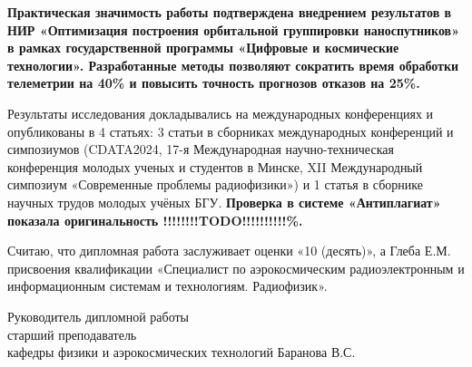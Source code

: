 \documentclass[14pt, a4paper]{bsu_review}
\begin{document}
\textbf{Практическая значимость работы подтверждена внедрением результатов в НИР «Оптимизация построения орбитальной группировки наноспутников» в рамках государственной программы «Цифровые и космические технологии». Разработанные методы позволяют сократить время обработки телеметрии на 40\% и повысить точность прогнозов отказов на 25\%.}


Результаты исследования докладывались на международных конференциях и опубликованы в 4 статьях: 3 статьи в сборниках международных конференций и симпозиумов (CDATA2024, 17-я Международная научно-техническая конференция молодых ученых и студентов в Минске, XII Международный симпозиум «Современные проблемы радиофизики») и 1 статья в сборнике научных трудов молодых учёных БГУ. \textbf{Проверка в системе «Антиплагиат» показала оригинальность !!!!!!!!TODO!!!!!!!!!!\%.
}


Считаю, что дипломная работа заслуживает оценки «10 (десять)», а Глеба Е.М. присвоения квалификации «Специалист по аэрокосмическим радиоэлектронным и информационным системам и технологиям. Радиофизик».

\vspace{1cm}

\noindent Руководитель дипломной работы\\
старший преподаватель\\
кафедры физики и аэрокосмических технологий
 \hfill Баранова В.С.
\end{document}
